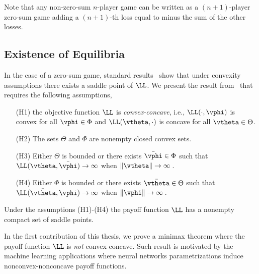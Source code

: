 Note that any non-zero-sum $n$-player game can be written as a $(n+1)$-player zero-sum game adding a $(n+1)$-th loss equal to minus the sum of the other losses. 










\subsection{Existence of Equilibria}





In the case of a zero-sum game, standard results~\citep{sion1958general,fan1953minimax,hiriart1993convex} show that under convexity assumptions there exists a saddle point of $\LL$. We present the result from~\citep{hiriart1993convex} that requires the following assumptions, 

\begin{enumerate}
\item[(H1)] the objective function $\LL$ is \emph{convex-concave}, i.e., $\LL(\cdot,\vphi)$ is convex for all $\vphi \in \Phi$ and $\LL(\vtheta,\cdot)$ is concave for all $\vtheta \in \Theta$.
\item[(H2)] The sets $\Theta$ and $\Phi$ are nonempty closed convex sets.
\item[(H3)] Either $\Theta$ is bounded or there exists $\bar\vphi \in \Phi$ such that $\LL(\vtheta,\bar \vphi) \to \infty$ when $\|\vtheta\| \to \infty$\,.
\item[(H4)] Either $\Phi$ is bounded or there exists $\bar\vtheta \in \Theta$ such that $\LL(\bar \vtheta, \vphi) \to \infty$ when $\|\vphi\| \to \infty$\,.
\end{enumerate}




\begin{theorem}\citep[Theorem 4.3.1]{hiriart1993convex}
Under the assumptions (H1)-(H4) the payoff function $\LL$ has a nonempty compact set of saddle points. 
\end{theorem}

In the first contribution of this thesis, we prove a minimax theorem where the payoff function $\LL$ is \emph{not} convex-concave. Such result is motivated by the machine learning applications where neural networks parametrizations induce nonconvex-nonconcave payoff functions. 





